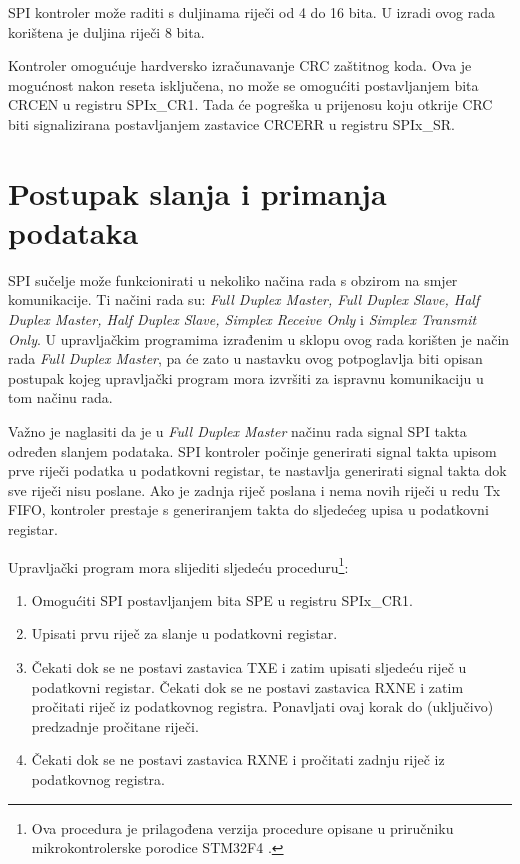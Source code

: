 SPI kontroler može raditi s duljinama riječi od 4 do 16 bita. U izradi ovog rada korištena je duljina riječi 8 bita.

Kontroler omogućuje hardversko izračunavanje CRC zaštitnog koda. Ova je mogućnost nakon reseta isključena, no može se omogućiti postavljanjem bita CRCEN u registru SPIx\_CR1. Tada će pogreška u prijenosu koju otkrije CRC biti signalizirana postavljanjem zastavice CRCERR u registru SPIx\_SR.

\section{Postupak slanja i primanja podataka}

SPI sučelje može funkcionirati u nekoliko načina rada s obzirom na smjer komunikacije. Ti načini rada su: \textit{Full Duplex Master, Full Duplex Slave, Half Duplex Master, Half Duplex Slave, Simplex Receive Only} i \textit{Simplex Transmit Only}. U upravljačkim programima izrađenim u sklopu ovog rada korišten je način rada \textit{Full Duplex Master}, pa će zato u nastavku ovog potpoglavlja biti opisan postupak kojeg upravljački program mora izvršiti za ispravnu komunikaciju u tom načinu rada.

Važno je naglasiti da je u \textit{Full Duplex Master} načinu rada signal SPI takta određen slanjem podataka. SPI kontroler počinje generirati signal takta upisom prve riječi podatka u podatkovni registar, te nastavlja generirati signal takta dok sve riječi nisu poslane. Ako je zadnja riječ poslana i nema novih riječi u redu Tx FIFO, kontroler prestaje s generiranjem takta do sljedećeg upisa u podatkovni registar.

Upravljački program mora slijediti sljedeću proceduru\footnote{Ova procedura je prilagođena verzija procedure opisane u priručniku mikrokontrolerske porodice STM32F4 \cite[str.~887]{stm32f4_manual}.}:
\begin{enumerate}
	\item Omogućiti SPI postavljanjem bita SPE u registru SPIx\_CR1.
	\item Upisati prvu riječ za slanje u podatkovni registar.
	\item Čekati dok se ne postavi zastavica TXE i zatim upisati sljedeću riječ u podatkovni registar. Čekati dok se ne postavi zastavica RXNE i zatim pročitati riječ iz podatkovnog registra. Ponavljati ovaj korak do (uključivo) predzadnje pročitane riječi.
	\item  Čekati dok se ne postavi zastavica RXNE i pročitati zadnju riječ iz podatkovnog registra.
\end{enumerate}

